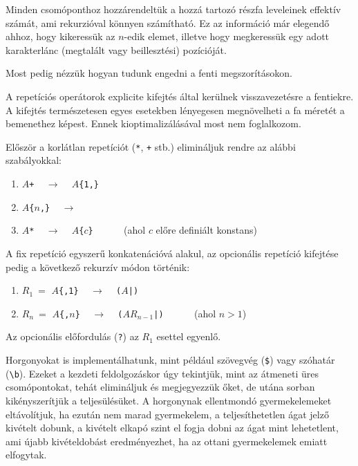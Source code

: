 \documentclass[
    parspace,
    noindent,
    nohyp,
]{elteiktdk}[2023/04/10]
\begin{document}

Minden csomóponthoz hozzárendeltük a hozzá tartozó részfa leveleinek effektív számát,
ami rekurzióval könnyen számítható.
Ez az információ már elegendő ahhoz, hogy kikeressük az $n$-edik elemet,
illetve hogy megkeressük egy adott karakterlánc (megtalált vagy beillesztési) pozícióját.



Most pedig nézzük hogyan tudunk engedni a fenti megszorításokon.

A repetíciós operátorok explicite kifejtés által kerülnek visszavezetésre a fentiekre.
A kifejtés természetesen egyes esetekben lényegesen megnövelheti a fa méretét a bemenethez képest.
Ennek kioptimalizálásával most nem foglalkozom.

Először a korlátlan repetíciót (\texttt{*}, \texttt{+} stb.) elimináljuk rendre az alábbi szabályokkal:

\begin{enumerate}
    \item \texttt{$A$+} ~ $\longrightarrow$ ~ \texttt{$A$\{1,\}}
    \item \texttt{$A$\{$n$,\}} ~ $\longrightarrow$ ~ 
    \item \texttt{$A$*} ~ $\longrightarrow$ ~ \texttt{$A$\{$c$\}} ~~~~~ (ahol $c$ előre definiált konstans)
\end{enumerate}

A fix repetíció egyszerű konkatenációvá alakul,
az opcionális repetíció kifejtése pedig a következő rekurzív módon történik:

\begin{enumerate}
    \item $R_1~=$ \texttt{$A$\{,1\}} ~ $\longrightarrow$ ~ \texttt{($A$|)}
    \item $R_n~=$ \texttt{$A$\{,$n$\}} ~ $\longrightarrow$ ~ \texttt{($AR_{n-1}$|)} ~~~~~ (ahol $n>1$)
\end{enumerate}

Az opcionális előfordulás (\texttt{?}) az $R_1$ esettel egyenlő.



Horgonyokat is implementálhatunk,
mint például szövegvég (\texttt{\$}) vagy szóhatár (\texttt{{\textbackslash}b}).
Ezeket a kezdeti feldolgozáskor úgy tekintjük,
mint az átmeneti üres csomópontokat, tehát elimináljuk és megjegyezzük őket,
de utána sorban kikényszerítjük a teljesülésüket.
A horgonynak ellentmondó gyermekelemeket eltávolítjuk,
ha ezután nem marad gyermekelem, a teljesíthetetlen ágat jelző kivételt dobunk,
a kivételt elkapó szint el fogja dobni az ágat mint lehetetlent,
ami újabb kivételdobást eredményezhet, ha az ottani gyermekelemek emiatt elfogytak.
\end{document}
